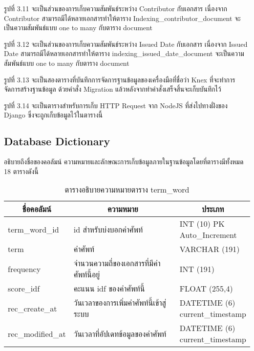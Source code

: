 รูปที่ 3.11 จะเป็นส่วนของการเก็บความสัมพันธ์ระหว่าง Contributor กับเอกสาร เนื่องจาก Contributor สามารถมีได้หลายเอกสารทำให้ตาราง Indexing\_contributor\_document จะเป็นความสัมพันธ์แบบ one to many กับตาราง document 

รูปที่ 3.12 จะเป็นส่วนของการเก็บความสัมพันธ์ระหว่าง Issued Date กับเอกสาร เนื่องจาก Issued Date สามารถมีได้หลายเอกสารทำให้ตาราง indexing\_issued\_date\_document จะเป็นความสัมพันธ์แบบ one to many กับตาราง document 

รูปที่ 3.13 จะเป็นสองตารางที่บันทึกการจัดการฐานข้อมูลของเครื่องมือที่ชื่อว่า Knex ที่จะทำการจัดการสร้างฐานข้อมูล ด้วยคำสั่ง Migration แล้วหลังจากทำคำสั่งเสร็จสิ้นจะเก็บบันทึกไว้

รูปที่ 3.14 จะเป็นตารางสำหรับการเก็บ HTTP Request จาก NodeJS ที่ส่งไปทางฝั่งของ Django ซึ่งจะถูกเก็บข้อมูลไว้ในตารางนี้

\subsection{Database Dictionary}

อธิบายถึงชื่อของคอลัมน์ ความหมายและลักษณะการเก็บข้อมูลภายในฐานข้อมูลโดยที่ตารางมีทั้งหมด 18 ตารางดังนี้



\begin{table}[H]
\caption{ตารางอธิบายความหมายตาราง term\_word}\label{tbl:termword}
\begin{tabular}{|l|l|l|}
\hline
\multicolumn{1}{|c|}{ชื่อคอลัมน์} & \multicolumn{1}{c|}{ความหมาย}             & \multicolumn{1}{c|}{ประเภท}                          \\ \hline
term\_word\_id    & id   สำหรับบ่งบอกคำศัพท์                 & \makecell[l]{INT   (10) PK\\ Auto\_Increment}     \\ \hline
term              & คำศัพท์                                  & VARCHAR   (191)                                                                   \\ \hline
frequency         & จำนวนความถี่ของเอกสารที่มีคำศัพท์นี้อยู่ & INT   (191)                                                                       \\ \hline
score\_idf        & คะแนน   idf ของคำศัพท์นี้                & FLOAT   (255,4)                                                                   \\ \hline
rec\_create\_at   & วันเวลาของการเพิ่มคำศัพท์นี้เข้าสู่ระบบ  & \makecell[l]{DATETIME   (6)\\   current\_timestamp} \\ \hline
rec\_modified\_at & วันเวลาที่อัปเดทข้อมูลของคำศัพท์         & \makecell[l]{DATETIME   (6)\\  current\_timestamp} \\ \hline
\end{tabular}
\end{table}


